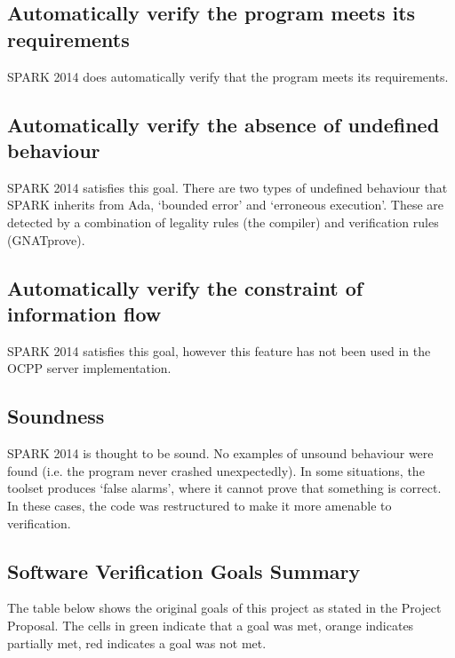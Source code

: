 \documentclass[12pt,openany,a4paper]{book}
\begin{document}
\subsection{Automatically verify the program meets its requirements}
SPARK 2014 does automatically verify that the program meets its requirements.

\subsection{Automatically verify the absence of undefined behaviour}
SPARK 2014 satisfies this goal. There are two types of undefined behaviour that SPARK inherits from Ada, `bounded error' and `erroneous execution'. These are detected by a combination of legality rules (the compiler) and verification rules (GNATprove).

\subsection{Automatically verify the constraint of information flow}
SPARK 2014 satisfies this goal, however this feature has not been used in the OCPP server implementation. 

\subsection{Soundness}
SPARK 2014 is thought to be sound. No examples of unsound behaviour were found (i.e. the program never crashed unexpectedly). In some situations, the toolset produces `false alarms', where it cannot prove that something is correct. In these cases, the code was restructured to make it more amenable to verification.

\subsection{Software Verification Goals Summary}

The table below shows the original goals of this project as stated in the Project Proposal. The cells in green indicate that a goal was met, orange indicates partially met, red indicates a goal was not met.
\end{document}
